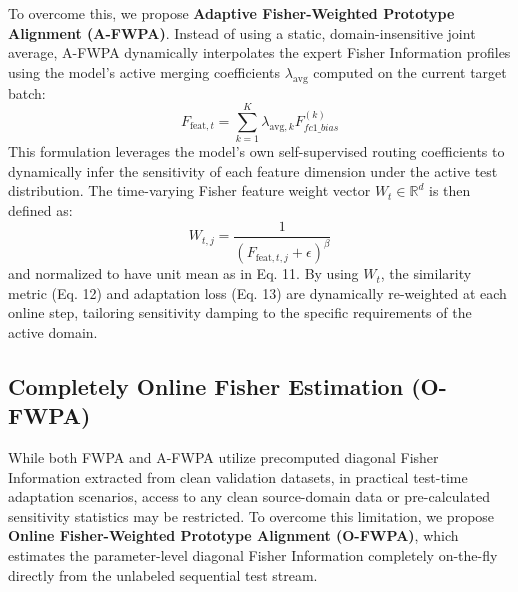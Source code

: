 \documentclass{article}
\theoremstyle{plain}
\theoremstyle{definition}
\theoremstyle{remark}
\begin{document}
To overcome this, we propose \textbf{Adaptive Fisher-Weighted Prototype Alignment (A-FWPA)}. Instead of using a static, domain-insensitive joint average, A-FWPA dynamically interpolates the expert Fisher Information profiles using the model's active merging coefficients $\lambda_{\text{avg}}$ computed on the current target batch:
\begin{equation}
    F_{\text{feat}, t} = \sum_{k=1}^K \lambda_{\text{avg}, k} F^{(k)}_{fc1\_bias}
\end{equation}
This formulation leverages the model's own self-supervised routing coefficients to dynamically infer the sensitivity of each feature dimension under the active test distribution. The time-varying Fisher feature weight vector $W_t \in \mathbb{R}^d$ is then defined as:
\begin{equation}
    W_{t, j} = \frac{1}{(F_{\text{feat}, t, j} + \epsilon)^\beta}
\end{equation}
and normalized to have unit mean as in Eq. 11. By using $W_t$, the similarity metric (Eq. 12) and adaptation loss (Eq. 13) are dynamically re-weighted at each online step, tailoring sensitivity damping to the specific requirements of the active domain.

\subsection{Completely Online Fisher Estimation (O-FWPA)}
While both FWPA and A-FWPA utilize precomputed diagonal Fisher Information extracted from clean validation datasets, in practical test-time adaptation scenarios, access to any clean source-domain data or pre-calculated sensitivity statistics may be restricted. To overcome this limitation, we propose \textbf{Online Fisher-Weighted Prototype Alignment (O-FWPA)}, which estimates the parameter-level diagonal Fisher Information completely on-the-fly directly from the unlabeled sequential test stream.
\end{document}
